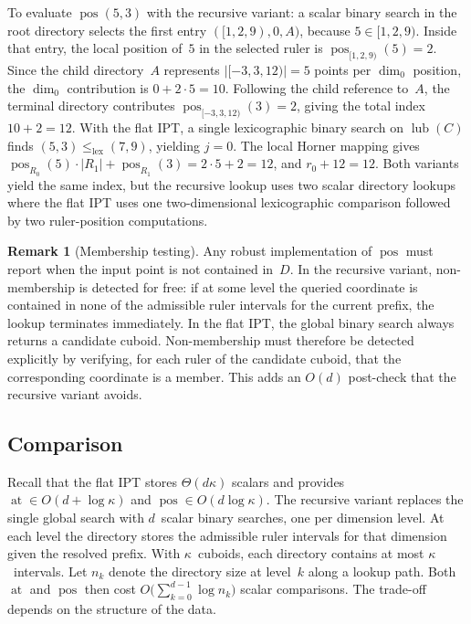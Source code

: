 \documentclass[manuscript,screen,review]{acmart}
\theoremstyle{definition}
\newtheorem{remark}{Remark}
\theoremstyle{plain}
\begin{document}
To evaluate $\operatorname{pos}(5,3)$ with the recursive variant:
a scalar binary search in the root directory selects the first entry
$([1,2,9),0,A)$, because $5\in[1,2,9)$.
Inside that entry, the local position of~$5$ in the selected ruler is
$\operatorname{pos}_{[1,2,9)}(5)=2$.
Since the child directory~$A$ represents $|[-3,3,12)| = 5$ points per
$\dim_0$ position, the $\dim_0$ contribution is
$0 + 2\cdot 5 = 10$.
Following the child reference to~$A$, the terminal directory contributes
$\operatorname{pos}_{[-3,3,12)}(3)=2$, giving the total index
$10+2=12$.
With the flat IPT, a single lexicographic binary search on
$\operatorname{lub}(C)$ finds
$(5,3)\le_{\mathrm{lex}}(7,9)$, yielding $j=0$.
The local Horner mapping gives
$\operatorname{pos}_{R_0}(5)\cdot|R_1|+\operatorname{pos}_{R_1}(3)
 =2\cdot 5+2=12$,
and $r_0+12=12$.
Both variants yield the same index, but the recursive lookup uses two
scalar directory lookups where the flat IPT uses one two-dimensional
lexicographic comparison followed by two ruler-position computations.

\begin{remark}[Membership testing]
Any robust implementation of $\operatorname{pos}$ must report when the input
point is not contained in~$D$.
In the recursive variant, non-membership is detected for
free: if at some level the queried coordinate is contained in none of
the admissible ruler intervals for the current prefix, the lookup
terminates immediately.
In the flat IPT, the global binary search always returns a candidate
cuboid.
Non-membership must therefore be detected explicitly by verifying, for
each ruler of the candidate cuboid, that the corresponding coordinate
is a member.
This adds an $O(d)$ post-check that the recursive variant avoids.
\end{remark}

\subsection{Comparison}
Recall that the flat IPT stores $\Theta(d\kappa)$ scalars and provides
$\operatorname{at}\in O(d+\log\kappa)$ and
$\operatorname{pos}\in O(d\log\kappa)$.
The recursive variant replaces the single global search
with $d$~scalar binary searches, one per dimension level.
At each level the directory stores the admissible ruler intervals
for that dimension given the resolved prefix.
With $\kappa$~cuboids, each directory contains at most $\kappa$~intervals.
Let $n_k$ denote the directory size at level~$k$ along a lookup path.
Both $\operatorname{at}$ and $\operatorname{pos}$ then cost
$O\!\bigl(\sum_{k=0}^{d-1}\log n_k\bigr)$
scalar comparisons.
The trade-off depends on the structure of the data.
\end{document}
